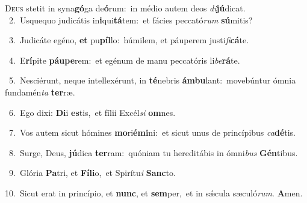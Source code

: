 \lettrine{\initial\textcolor{\initialcolor}{D}}{eus} stetit in syna\-\textbf{gó}\-ga de\-\textbf{ó}\-rum:~\star in médio autem deos \textit{di}\-\textbf{jú}dicat.\\
{\numbfont\textcolor{\numbcolor}{~2.}}~Usquequo judicátis in\-\textbf{i}\-qui\-\textbf{tá}\-tem:~\star et fácies peccató\textit{rum} \textbf{sú}\-mitis?\par
{\numbfont\textcolor{\numbcolor}{~3.}}~Judicáte egéno, \textbf{et} pu\-\textbf{píl}\-lo:~\star húmilem, et páuperem justi\-\textit{fi}\-\textbf{cá}te.\par
{\numbfont\textcolor{\numbcolor}{~4.}}~E\-\textbf{rí}\-pite \textbf{páu}\-\textbf{pe}rem:~\star et egénum de manu peccatóris li\-\textit{be}\-\textbf{rá}te.\par
{\numbfont\textcolor{\numbcolor}{~5.}}~Nesciérunt, neque intellexérunt, in \textbf{té}\-nebris \textbf{ám}\-\textbf{bu}lant:~\star movebúntur ómnia fundamén\textit{ta} \textbf{ter}\-ræ.\par
{\numbfont\textcolor{\numbcolor}{~6.}}~Ego dixi: \textbf{Di}\-i \textbf{es}\-tis,~\star et fílii Excél\textit{si} \textbf{om}\-nes.\par
{\numbfont\textcolor{\numbcolor}{~7.}}~Vos autem sicut hómines \textbf{mo}\-ri\-\textbf{é}\-\textbf{mi}ni:~\star et sicut unus de princípibus \textit{ca}\-\textbf{dé}tis.\par
{\numbfont\textcolor{\numbcolor}{~8.}}~Surge, Deus, \textbf{jú}\-dica \textbf{ter}\-ram:~\star quóniam tu hereditábis in ómni\textit{bus} \textbf{Gén}\-tibus.\par
{\numbfont\textcolor{\numbcolor}{~9.}}~Glória \textbf{Pa}\-tri, et \textbf{Fí}\-\textbf{li}o,~\star et Spirítu\textit{i} \textbf{Sanc}\-to.\par
{\numbfont\textcolor{\numbcolor}{10.}}~Sicut erat in princípio, et \textbf{nunc}\-, et \textbf{sem}\-per,~\star et in sǽcula sæculó\-\textit{rum}\-. \textbf{A}\-men.\par
